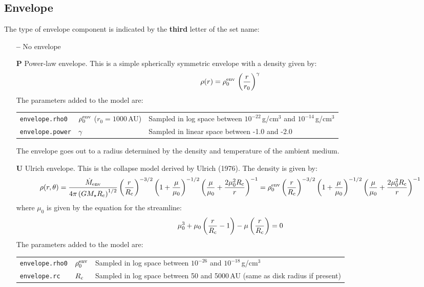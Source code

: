 \documentclass[10pt]{article}
\newcommand{\mdote}{\dot{M}_{\rm env}}
\newcommand{\mstar}{M_\star}
\newcommand{\rc}{R_{\rm c}}
\begin{document}
\subsection{Envelope}

The type of envelope component is indicated by the \textbf{third} letter of the set name:

\begin{itemize}

\item[\textbf{--}] No envelope

\item[\textbf{P}] Power-law envelope. This is a simple spherically symmetric envelope with a density given by:
$$
\rho(r) = \rho_0^{\rm env}\,\left(\frac{r}{r_0}\right)^\gamma
$$
The parameters added to the model are:

\begin{center}
  \begin{tabular}{llp{4in}}
    \texttt{envelope.rho0} & $\rho_0^{\rm env}$ ($r_0=1000$\,AU) & Sampled in log space between $10^{-22}$\,g/cm$^3$ and $10^{-14}$\,g/cm$^3$\\
     \texttt{envelope.power} & $\gamma$ & Sampled in linear space between -1.0 and -2.0 \\
  \end{tabular}
\end{center}

The envelope goes out to a radius determined by the density and temperature of the ambient medium.

\item[\textbf{U}] Ulrich envelope. This is the collapse model derived by Ulrich (1976). The density is given by:
$$
\rho(r,\theta) = \frac{\mdote}{4\pi\left(G\mstar\rc\right)^{1/2}}\left(\frac{r}{\rc}\right)^{-3/2}\left(1 + \frac{\mu}{\mu_0}\right)^{-1/2}\left(\frac{\mu}{\mu_0} + \frac{2\mu_0^2\rc}{r}\right)^{-1} = \rho_0^{\rm env}\left(\frac{r}{\rc}\right)^{-3/2}\left(1 + \frac{\mu}{\mu_0}\right)^{-1/2}\left(\frac{\mu}{\mu_0} + \frac{2\mu_0^2\rc}{r}\right)^{-1}
$$
where $\mu_0$ is given by the equation for the streamline:
$$
\mu_0^3 + \mu_0\left(\frac{r}{\rc} - 1\right) - \mu\left(\frac{r}{\rc}\right) = 0
$$
The parameters added to the model are:

\begin{center}
  \begin{tabular}{llp{4in}}
    \texttt{envelope.rho0} & $\rho_0^{\rm env}$ & Sampled in log space between $10^{-26}$ and $10^{-18}$\,g/cm$^3$ \\
    \texttt{envelope.rc} & $\rc$ & Sampled in log space between 50 and 5000\,AU (same as disk radius if present)  \\
  \end{tabular}
\end{center}


\end{itemize}
\end{document}
